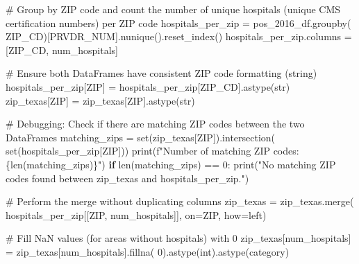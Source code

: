 \documentclass[
  letterpaper,
  DIV=11,
  numbers=noendperiod]{scrartcl}
\newenvironment{Shaded}{\begin{snugshade}}{\end{snugshade}}
\newcommand{\BuiltInTok}[1]{\textcolor[rgb]{0.00,0.23,0.31}{#1}}
\newcommand{\CommentTok}[1]{\textcolor[rgb]{0.37,0.37,0.37}{#1}}
\newcommand{\ControlFlowTok}[1]{\textcolor[rgb]{0.00,0.23,0.31}{\textbf{#1}}}
\newcommand{\DecValTok}[1]{\textcolor[rgb]{0.68,0.00,0.00}{#1}}
\newcommand{\NormalTok}[1]{\textcolor[rgb]{0.00,0.23,0.31}{#1}}
\newcommand{\OperatorTok}[1]{\textcolor[rgb]{0.37,0.37,0.37}{#1}}
\newcommand{\SpecialCharTok}[1]{\textcolor[rgb]{0.37,0.37,0.37}{#1}}
\newcommand{\SpecialStringTok}[1]{\textcolor[rgb]{0.13,0.47,0.30}{#1}}
\newcommand{\StringTok}[1]{\textcolor[rgb]{0.13,0.47,0.30}{#1}}
\begin{document}
\begin{Shaded}
\begin{Highlighting}[]
\CommentTok{\# Group by ZIP code and count the number of unique hospitals (unique CMS certification numbers) per ZIP code}
\NormalTok{hospitals\_per\_zip }\OperatorTok{=}\NormalTok{ pos\_2016\_df.groupby(}
    \StringTok{\textquotesingle{}ZIP\_CD\textquotesingle{}}\NormalTok{)[}\StringTok{\textquotesingle{}PRVDR\_NUM\textquotesingle{}}\NormalTok{].nunique().reset\_index()}
\NormalTok{hospitals\_per\_zip.columns }\OperatorTok{=}\NormalTok{ [}\StringTok{\textquotesingle{}ZIP\_CD\textquotesingle{}}\NormalTok{, }\StringTok{\textquotesingle{}num\_hospitals\textquotesingle{}}\NormalTok{]}

\CommentTok{\# Ensure both DataFrames have consistent ZIP code formatting (string)}
\NormalTok{hospitals\_per\_zip[}\StringTok{\textquotesingle{}ZIP\textquotesingle{}}\NormalTok{] }\OperatorTok{=}\NormalTok{ hospitals\_per\_zip[}\StringTok{\textquotesingle{}ZIP\_CD\textquotesingle{}}\NormalTok{].astype(}\BuiltInTok{str}\NormalTok{)}
\NormalTok{zip\_texas[}\StringTok{\textquotesingle{}ZIP\textquotesingle{}}\NormalTok{] }\OperatorTok{=}\NormalTok{ zip\_texas[}\StringTok{\textquotesingle{}ZIP\textquotesingle{}}\NormalTok{].astype(}\BuiltInTok{str}\NormalTok{)}

\CommentTok{\# Debugging: Check if there are matching ZIP codes between the two DataFrames}
\NormalTok{matching\_zips }\OperatorTok{=} \BuiltInTok{set}\NormalTok{(zip\_texas[}\StringTok{\textquotesingle{}ZIP\textquotesingle{}}\NormalTok{]).intersection(}
    \BuiltInTok{set}\NormalTok{(hospitals\_per\_zip[}\StringTok{\textquotesingle{}ZIP\textquotesingle{}}\NormalTok{]))}
\BuiltInTok{print}\NormalTok{(}\SpecialStringTok{f"Number of matching ZIP codes: }\SpecialCharTok{\{}\BuiltInTok{len}\NormalTok{(matching\_zips)}\SpecialCharTok{\}}\SpecialStringTok{"}\NormalTok{)}
\ControlFlowTok{if} \BuiltInTok{len}\NormalTok{(matching\_zips) }\OperatorTok{==} \DecValTok{0}\NormalTok{:}
    \BuiltInTok{print}\NormalTok{(}\StringTok{"No matching ZIP codes found between zip\_texas and hospitals\_per\_zip."}\NormalTok{)}

\CommentTok{\# Perform the merge without duplicating columns}
\NormalTok{zip\_texas }\OperatorTok{=}\NormalTok{ zip\_texas.merge(}
\NormalTok{    hospitals\_per\_zip[[}\StringTok{\textquotesingle{}ZIP\textquotesingle{}}\NormalTok{, }\StringTok{\textquotesingle{}num\_hospitals\textquotesingle{}}\NormalTok{]], on}\OperatorTok{=}\StringTok{\textquotesingle{}ZIP\textquotesingle{}}\NormalTok{, how}\OperatorTok{=}\StringTok{\textquotesingle{}left\textquotesingle{}}\NormalTok{)}

\CommentTok{\# Fill NaN values (for areas without hospitals) with 0}
\NormalTok{zip\_texas[}\StringTok{\textquotesingle{}num\_hospitals\textquotesingle{}}\NormalTok{] }\OperatorTok{=}\NormalTok{ zip\_texas[}\StringTok{\textquotesingle{}num\_hospitals\textquotesingle{}}\NormalTok{].fillna(}
    \DecValTok{0}\NormalTok{).astype(}\BuiltInTok{int}\NormalTok{).astype(}\StringTok{\textquotesingle{}category\textquotesingle{}}\NormalTok{)}
\end{Highlighting}
\end{Shaded}
\end{document}
